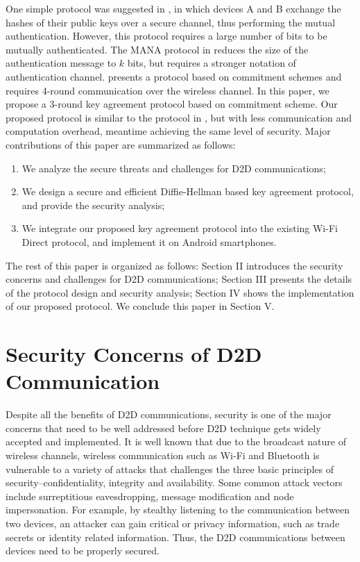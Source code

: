 \documentclass[conference]{IEEEtran}
\begin{document}
One simple protocol was suggested in \cite{tts}, in which devices A and B exchange the hashes of their public keys over a secure channel, thus performing the mutual authentication. However, this protocol requires a large number of bits to be mutually authenticated. The MANA protocol in \cite{mana} reduces the size of the authentication message to $k$ bits, but requires a stronger notation of authentication channel. \cite{ka} presents a protocol based on commitment schemes and requires 4-round communication over the wireless channel. In this paper, we propose a 3-round key agreement protocol based on commitment scheme. Our proposed protocol is similar to the protocol in \cite{ka}, but with less communication and computation overhead, meantime achieving the same level of security. Major contributions of this paper are summarized as follows:
\begin{enumerate}
  \item We analyze the secure threats and challenges for D2D communications;
  \item We design a secure and efficient Diffie-Hellman based key agreement protocol, and provide the security analysis;
  \item We integrate our proposed key agreement protocol into the existing Wi-Fi Direct protocol, and implement it on Android smartphones.
\end{enumerate}

The rest of this paper is organized as follows: Section II introduces the security concerns and challenges for D2D communications; Section III presents the details of the protocol design and security analysis; Section IV shows the implementation of our proposed protocol. We conclude this paper in Section V.

\section{Security Concerns of D2D Communication \label{sec2}}
Despite all the benefits of D2D communications, security is one of the major concerns that need to be well addressed before D2D technique gets widely accepted and implemented. It is well known that due to the broadcast nature of wireless channels, wireless communication such as Wi-Fi and Bluetooth is vulnerable to a variety of attacks that challenges the three basic principles of security--confidentiality, integrity and availability. Some common attack vectors include surreptitious eavesdropping, message modification and node impersonation. For example, by stealthy listening to the communication between two devices, an attacker can gain critical or privacy information, such as trade secrets or identity related information. Thus, the D2D communications between devices need to be properly secured. 
\end{document}
